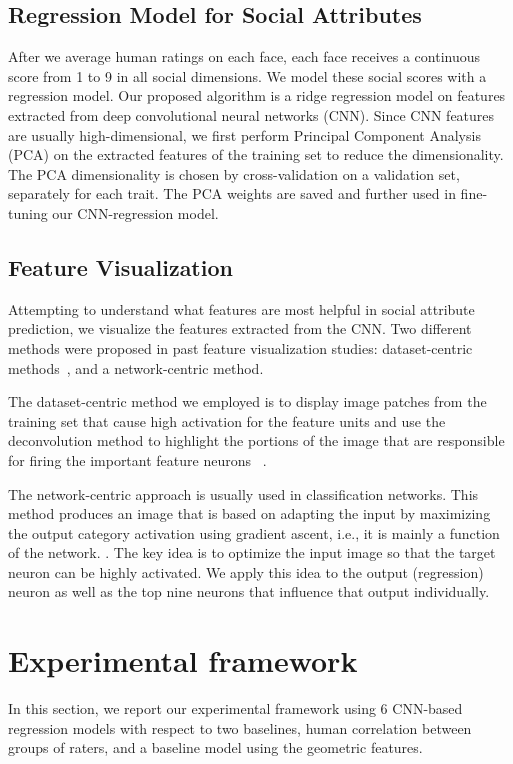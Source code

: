 \documentclass[10pt,twocolumn,letterpaper]{article}
\begin{document}
\subsection{Regression Model for Social Attributes}
After we average human ratings on each face, each face receives a continuous score from 1 to 9 in all social dimensions. We model these social scores with a regression model. Our proposed algorithm is a ridge regression model on features extracted from deep convolutional neural networks (CNN). Since CNN features are usually high-dimensional, we first perform Principal Component Analysis (PCA) on the extracted features of the training set to reduce the dimensionality. The PCA dimensionality is chosen by cross-validation on a validation set, separately for each trait. The PCA weights are saved and further used in fine-tuning our CNN-regression model. 

\subsection{Feature Visualization}
\label{sec:fv}
Attempting to understand what features are most helpful in social attribute prediction, we visualize the features extracted from the CNN. Two different methods were proposed in past feature visualization studies: dataset-centric methods~\cite{yosinski2015understanding, zeiler2014visualizing}, 
and a network-centric method\cite{yosinski2015understanding,yu2016deep}. 

The dataset-centric method we employed is to display image patches from the training set that cause high activation for the feature units and use the deconvolution method to highlight the portions of the image that are responsible for firing the important feature neurons ~\cite{yosinski2015understanding,zeiler2014visualizing}. 

The network-centric approach is usually used in classification networks. This method produces an image that is based on adapting the input by maximizing the output category activation using gradient ascent, i.e., it is mainly a function of the network.
 \cite{yosinski2015understanding, yu2016deep}. The key idea is to optimize the input image so that the target neuron can be highly activated. We apply this idea to the output (regression) neuron as well as the top nine neurons that influence that output individually.

\section{Experimental framework} \label{experiment}
In this section, we report our experimental framework using 6 CNN-based regression models with respect to two baselines, human correlation between groups of raters, and a baseline model using the geometric features. 
\end{document}
